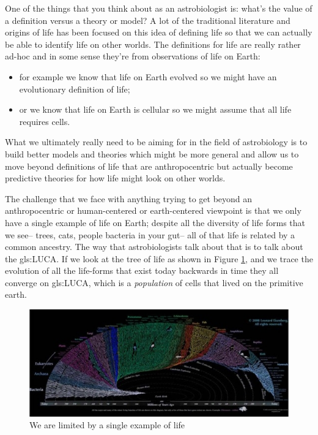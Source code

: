 \documentclass[]{article}
\begin{document}
One of the things that  you think about as an astrobiologist is: what's the value of a definition versus a theory or model? A lot of the traditional literature and origins of life has been focused on this idea of defining life so that we can actually be able to identify life on other worlds. The definitions for life are really rather ad-hoc and in
some sense they're  from observations of life on Earth:
\begin{itemize}
	\item  for example we know that life on Earth evolved so we might have an evolutionary definition of life;
	\item or we know that life on Earth is cellular so we might assume that all life requires cells.
\end{itemize}

What we ultimately really need to be aiming for
in the field of astrobiology is to build
better models and theories which might
be more general and allow us to move
beyond definitions of life that are
anthropocentric but
actually become predictive theories for
how life might look on other worlds.

The challenge that we face with anything
trying to get beyond an anthropocentric
or human-centered or earth-centered
viewpoint is that we only have a single
example of life on Earth; despite all
the diversity of life forms that we see--
trees, cats, people bacteria in your gut--
all of that life is related by a common ancestry.
The way that astrobiologists talk
about that is to talk about
the \gls{gls:LUCA}.
If we look at the tree of life
as shown in Figure \ref{fig:yatol}, and we trace
the evolution of all the life-forms that
exist today backwards in time they all
converge on \gls{gls:LUCA}, which is a
\emph{population} of cells that lived on the
primitive earth.


\begin{figure}[H]
	\caption{We are limited by a single example of life}\label{fig:yatol}
	\includegraphics[width=\textwidth]{YATOL}
\end{figure}
\end{document}
